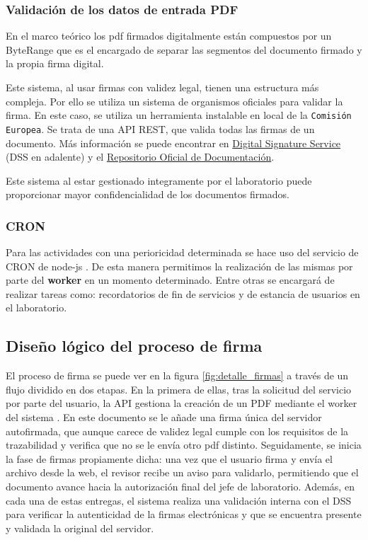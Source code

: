 \subsubsection{Validación de los datos de entrada PDF}

En el marco teórico los pdf firmados digitalmente están compuestos por un ByteRange que es el encargado de separar las segmentos del documento firmado y la propia firma digital. \cite{sign_verification} 

Este sistema, al usar firmas con validez legal, tienen una estructura más compleja. Por ello se utiliza un sistema de organismos oficiales para validar la firma. En este caso, se utiliza un herramienta instalable en local de la \texttt{Comisión Europea}. Se trata de una API REST, que valida todas las firmas de un documento. Más información se puede encontrar en \href{https://ec.europa.eu/digital-building-blocks/sites/spaces/DIGITAL/pages/467109107/Digital+Signature+Service+-+DSS}{Digital Signature Service} (DSS en adalente) y el \href{https://github.com/esig/dss-demonstrations}{Repositorio Oficial de Documentación}. \cite{github_dss} 

Este sistema al estar gestionado integramente por el laboratorio puede proporcionar mayor confidencialidad de los documentos firmados.

\subsubsection{CRON}

Para las actividades con una perioricidad determinada se hace uso del servicio de CRON de node-js \cite{cron}. De esta manera permitimos la realización de las mismas por parte del \textbf{worker} en un momento determinado. Entre otras se encargará de realizar tareas como: recordatorios de fin de servicios y de estancia de usuarios en el laboratorio. 


\subsection{Diseño lógico del proceso de firma}

El proceso de firma se puede ver en la figura \ref{fig:detalle_firmas} a través de un flujo dividido en dos etapas. En la primera de ellas, tras la solicitud del servicio por parte del usuario, la API gestiona la creación de un PDF mediante el worker del sistema \cite{pdfkit_generator}. En este documento se le añade una firma única del servidor autofirmada, que aunque carece de validez legal cumple con los requisitos de la trazabilidad y verifica que no se le envía otro pdf distinto. Seguidamente, se inicia la fase de firmas propiamente dicha: una vez que el usuario firma y envía el archivo desde la web, el revisor recibe un aviso para validarlo, permitiendo que el documento avance hacia la autorización final del jefe de laboratorio. Además, en cada una de estas entregas, el sistema realiza una validación interna con el DSS para verificar la autenticidad de la firmas electrónicas y que se encuentra presente y validada la original del servidor.


